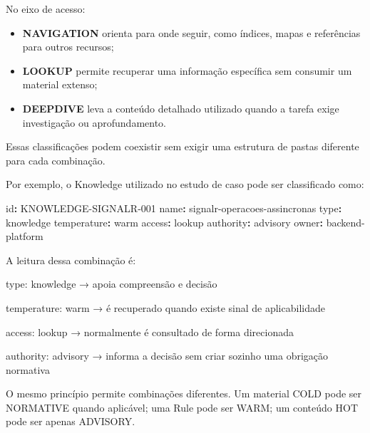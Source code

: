 \documentclass[
  10pt,
  a4paper,
  oneside]{book}
\newenvironment{Shaded}{}{}
\newcommand{\AttributeTok}[1]{\textcolor[rgb]{0.49,0.56,0.16}{#1}}
\newcommand{\FunctionTok}[1]{\textcolor[rgb]{0.02,0.16,0.49}{#1}}
\newcommand{\KeywordTok}[1]{\textcolor[rgb]{0.00,0.44,0.13}{\textbf{#1}}}
\newcommand{\NormalTok}[1]{#1}
\providecommand{\tightlist}{%
  \setlength{\itemsep}{0pt}\setlength{\parskip}{0pt}}
\renewenvironment{Shaded}{\begin{snugshade}}{\end{snugshade}}%
\begin{document}
No eixo de acesso:

\begin{itemize}
\tightlist
\item
  \textbf{NAVIGATION} orienta para onde seguir, como índices, mapas e
  referências para outros recursos;
\item
  \textbf{LOOKUP} permite recuperar uma informação específica sem
  consumir um material extenso;
\item
  \textbf{DEEPDIVE} leva a conteúdo detalhado utilizado quando a tarefa
  exige investigação ou aprofundamento.
\end{itemize}

Essas classificações podem coexistir sem exigir uma estrutura de pastas
diferente para cada combinação.

Por exemplo, o Knowledge utilizado no estudo de caso pode ser
classificado como:

\begin{Shaded}
\begin{Highlighting}[]
\FunctionTok{id}\KeywordTok{:}\AttributeTok{ KNOWLEDGE{-}SIGNALR{-}001}
\FunctionTok{name}\KeywordTok{:}\AttributeTok{ signalr{-}operacoes{-}assincronas}
\FunctionTok{type}\KeywordTok{:}\AttributeTok{ knowledge}
\FunctionTok{temperature}\KeywordTok{:}\AttributeTok{ warm}
\FunctionTok{access}\KeywordTok{:}\AttributeTok{ lookup}
\FunctionTok{authority}\KeywordTok{:}\AttributeTok{ advisory}
\FunctionTok{owner}\KeywordTok{:}\AttributeTok{ backend{-}platform}
\end{Highlighting}
\end{Shaded}

A leitura dessa combinação é:

\begin{Shaded}
\begin{Highlighting}[]
\NormalTok{type: knowledge}
\NormalTok{→ apoia compreensão e decisão}

\NormalTok{temperature: warm}
\NormalTok{→ é recuperado quando existe sinal de aplicabilidade}

\NormalTok{access: lookup}
\NormalTok{→ normalmente é consultado de forma direcionada}

\NormalTok{authority: advisory}
\NormalTok{→ informa a decisão sem criar sozinho uma obrigação normativa}
\end{Highlighting}
\end{Shaded}

O mesmo princípio permite combinações diferentes. Um material COLD pode
ser NORMATIVE quando aplicável; uma Rule pode ser WARM; um conteúdo HOT
pode ser apenas ADVISORY.
\end{document}
